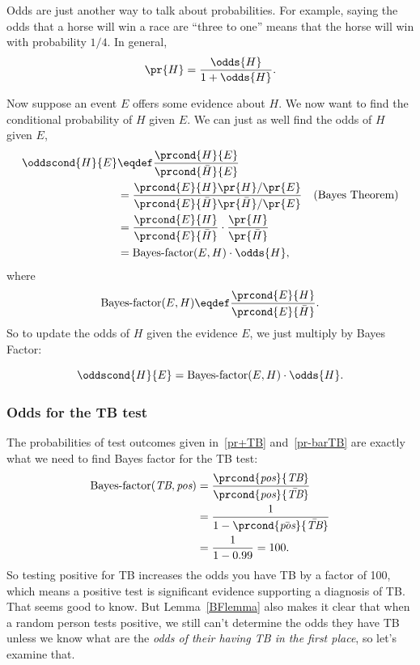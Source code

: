 Odds are just another way to talk about probabilities.  For example,
saying the odds that a horse will win a race are ``three to one''
means that the horse will win with probability $1/4$.  In general,
\[
\pr{H} = \frac{\odds{H}}{1 + \odds{H}}.
\]

Now suppose an event $E$ offers some evidence about $H$.  We now want
to find the conditional probability of $H$ given $E$.  We can just as
well find the odds of $H$ given $E$,
\begin{align*}
\oddscond{H}{E}
  & \eqdef \frac{\prcond{H}{E}}{\prcond{\bar{H}}{E}}\\
  & = \frac{\prcond{E}{H}\pr{H}/\pr{E}}{\prcond{E}{\bar{H}}\pr{\bar{H}}/\pr{E}}
          & \text{(Bayes Theorem)}\\
  & = \frac{\prcond{E}{H}}{\prcond{E}{\bar{H}}} \cdot \frac{\pr{H}}{\pr{\bar{H}}}\\
  & = \BF{E}{H} \cdot \odds{H},
\end{align*}
where
\[
\BF{E}{H} \eqdef \frac{\prcond{E}{H}}{\prcond{E}{\bar{H}}}.
\]
So to update the odds of $H$ given the evidence $E$, we just multiply
by Bayes Factor:
\begin{lemma}\label{BFlemma}
\[
\oddscond{H}{E} = \BF{E}{H} \cdot \odds{H}.
\]
\end{lemma}

\subsubsection{Odds for the TB test}
The probabilities of test outcomes given in~\eqref{pr+TB}
and~\eqref{pr-barTB} are exactly what we need to find Bayes factor for
the TB test:
\begin{align*}
\BF{\TB}{\testplus}
 & = \frac{\prcond{\testplus}{\TB}}{\prcond{\testplus}{\bar{\TB}}}\\
 & = \frac{1}{1-\prcond{\bar{\testplus}}{\bar{\TB}}}\\
 & = \frac{1}{1 - 0.99} = 100.
\end{align*}
So testing positive for TB increases the odds you have TB by a factor
of 100, which means a positive test is significant evidence supporting
a diagnosis of TB.  That seems good to know.  But Lemma~\ref{BFlemma}
also makes it clear that when a random person tests positive, we still
can't determine the odds they have TB unless we know what are the
\emph{odds of their having TB in the first place}, so let's examine
that.

